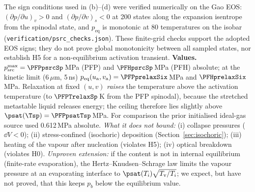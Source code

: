 The sign conditions used in (b)--(d) were verified numerically on the Gao EOS: $(\partial p/\partial u)_v>0$ and
$(\partial p/\partial v)_s<0$ at 200 states along the expansion isentrope from the spinodal state, and $p_{\mathrm{eq}}$ is
monotonic at 80 temperatures on the isobar (\texttt{verification/psrc\_checks.json}).
These finite-grid checks support the adopted EOS signs; they do not prove global monotonicity
between all sampled states, nor establish H5 for a non-equilibrium activation transient.
\textbf{Values.} $p_{\mathrm{src}}^{\max}=\PFPpsrcSp$\,MPa (PFP) and $\PFHpsrcSp$\,MPa (PFH) absolute; at the kinetic limit
(6\,$\mu$m, 5\,ns) $p_{\mathrm{eq}}(u_{\mathrm a},v_{\mathrm a})=\PFPprelaxSix$\,MPa and $\PFHprelaxSix$\,MPa. Relaxation at fixed
$(u,v)$ \emph{raises} the temperature above the activation temperature (to $\PFPTrelaxSp$\,K from the PFP spinodal),
because the stretched metastable liquid releases energy; the ceiling therefore lies slightly above
$\psat(\Tsp)=\PFPpsatTsp$\,MPa. For comparison the prior initialised ideal-gas source used 0.612\,MPa absolute.
\emph{What it does not bound:} (i) collapse pressures ($\dd V<0$); (ii) stress-confined (isochoric) deposition
(Section~\ref{sec:isochoric}); (iii) heating of the vapour after nucleation (violates H5); (iv) optical breakdown
(violates H0). \emph{Unproven extension:} if the content is not in internal equilibrium (finite-rate evaporation), the
Hertz--Knudsen--Schrage law limits the vapour pressure at an evaporating interface to $\psat(T_i)\sqrt{T_{\mathrm v}/T_i}$;
we expect, but have not proved, that this keeps $p_b$ below the equilibrium value.

